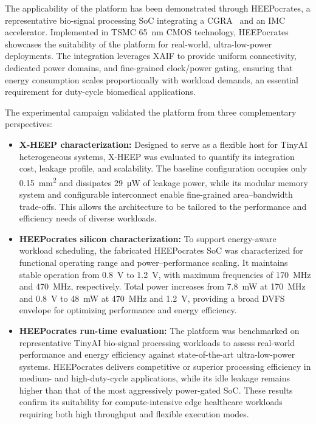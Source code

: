         The applicability of the platform has been demonstrated through \mbox{HEEPocrates}, a representative bio-signal processing SoC integrating a CGRA~\cite{oe-cgra} and an IMC~\cite{blade} accelerator. Implemented in TSMC \SI{65}{\nano\meter} CMOS technology, \mbox{HEEPocrates} showcases the suitability of the platform for real-world, ultra-low-power deployments. The integration leverages XAIF to provide uniform connectivity, dedicated power domains, and fine-grained clock/power gating, ensuring that energy consumption scales proportionally with workload demands, an essential requirement for duty-cycle biomedical applications.
        
        The experimental campaign validated the platform from three complementary perspectives:
        
        \vspace{-1em}
        \begin{itemize}
            \item \textbf{X-HEEP characterization:} Designed to serve as a flexible host for TinyAI heterogeneous systems, \mbox{X-HEEP} was evaluated to quantify its integration cost, leakage profile, and scalability. The baseline configuration occupies only \SI{0.15}{\milli\meter\squared} and dissipates \SI{29}{\micro\watt} of leakage power, while its modular memory system and configurable interconnect enable fine-grained area–bandwidth trade-offs. This allows the architecture to be tailored to the performance and efficiency needs of diverse workloads.
        
            \item \textbf{HEEPocrates silicon characterization:} To support energy-aware workload scheduling, the fabricated \mbox{HEEPocrates} SoC was characterized for functional operating range and power–performance scaling. It maintains stable operation from \SI{0.8}{\volt} to \SI{1.2}{\volt}, with maximum frequencies of \SI{170}{\mega\hertz} and \SI{470}{\mega\hertz}, respectively. Total power increases from \SI{7.8}{\milli\watt} at \SI{170}{\mega\hertz} and \SI{0.8}{\volt} to \SI{48}{\milli\watt} at \SI{470}{\mega\hertz} and \SI{1.2}{\volt}, providing a broad DVFS envelope for optimizing performance and energy efficiency.
        
            \item \textbf{HEEPocrates run-time evaluation:} The platform was benchmarked on representative TinyAI bio-signal processing workloads to assess real-world performance and energy efficiency against state-of-the-art ultra-low-power systems. \mbox{HEEPocrates} delivers competitive or superior processing efficiency in medium- and high-duty-cycle applications, while its idle leakage remains higher than that of the most aggressively power-gated SoC. These results confirm its suitability for compute-intensive edge healthcare workloads requiring both high throughput and flexible execution modes.
        \end{itemize}
        \vspace{-1em}
        
